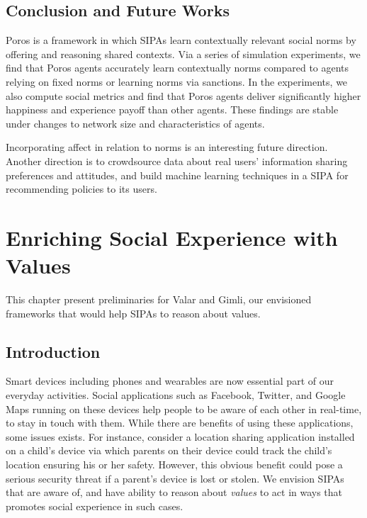 \documentclass[11pt,          %
               phd,           %
               onehalfspacing %
               ]{ncsuthesis}
\newcommand{\fsl}{\textsl}
\newcommand{\frameworkB}{Poros\xspace}
\newcommand{\frameworkC}{Valar\xspace}
\newcommand{\frameworkD}{Gimli\xspace}
\begin{document}
\section{Conclusion and Future Works}
\label{sec:precious-discussion}

\frameworkB is a framework in which SIPAs learn contextually relevant
social norms by offering and reasoning shared contexts. Via a series of
simulation experiments, we find that \frameworkB agents accurately learn
contextually norms compared to agents relying on fixed norms or learning
norms via sanctions. In the experiments, we also compute social metrics
and find that \frameworkB agents deliver significantly higher happiness
and experience payoff than other agents. These findings are stable under
changes to network size and characteristics of agents.

Incorporating affect in relation to norms
\citep{Ferreira-AAAI13-GroupRelations} is an interesting future
direction. Another direction is to crowdsource data about real users'
information sharing preferences and attitudes, and build machine
learning techniques in a SIPA for recommending policies to its users.

\chapter{Enriching Social Experience with Values}
\label{chap:valar}

This chapter present preliminaries for \frameworkC and \frameworkD, our
envisioned frameworks that would help SIPAs to reason about values.

\section{Introduction}
\label{sec:valar-intro}

Smart devices including phones and wearables are now essential part of
our everyday activities. Social applications such as Facebook, Twitter,
and Google Maps running on these devices help people to be aware of each
other in real-time, to stay in touch with them. While there are benefits
of using these applications, some issues exists. For instance, consider
a location sharing application installed on a child's device via which
parents on their device could track the child's location ensuring his or
her safety. However, this obvious benefit could pose a serious security
threat if a parent's device is lost or stolen. We envision SIPAs that
are aware of, and have ability to reason about \fsl{values} to act in
ways that promotes social experience in such cases.
\end{document}
